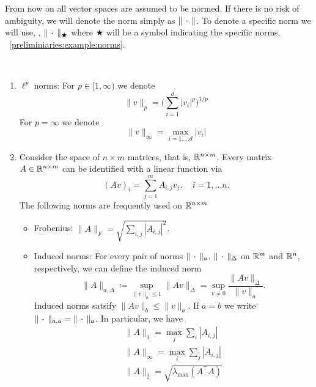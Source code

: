 From now on all vector spaces are assumed to be normed. If there is no risk of ambiguity, we will denote the norm simply as $\|\,\cdot\,\|$. To denote a specific norm we will use, \eg, $\|\,\cdot\,\|_\bigstar$ where $\bigstar$ will be a symbol indicating the specific norms, \cf~\cref{preliminiaries:example:norms}.

\begin{example}\
    \label{preliminiaries:example:norms}
    \begin{enumerate}
        \item $\ell^p$ norms: For $p\in [1,\infty)$ we denote 
        \begin{equation}
            \|v\|_p = \bigg( \sum_{i=1}^d |v_i|^p\bigg)^{1/p}
        \end{equation}
        For $p=\infty$ we denote 
        \begin{equation}
            \|v\|_\infty = \max_{i=1,\dots d}|v_i|
        \end{equation}
        \item Consider the space of $n\times m$ matrices, that is, $\mathbb{R}^{n\times m}$. Every matrix $A\in\mathbb{R}^{n\times m}$ can be identified with a linear function via
        \begin{equation}
            (Av)_i = \sum_{j=1}^m A_{i,j}v_j,\quad i=1,\dots n.
        \end{equation}
        The following norms are frequently used on $\mathbb{R}^{n\times m}$
        \begin{itemize}
            \item Frobenius: $\|A\|_F = \sqrt{\sum_{i,j}|A_{i,j}|^2}$.
            \item Induced norms: For every pair of norms $\|\,\cdot\,\|_a$, $\|\,\cdot\,\|_{\Delta}$ on $\mathbb{R}^m$ and $\mathbb{R}^n$, respectively, we can define the induced norm
            \begin{equation}
                \|A\|_{a,\Delta} \coloneq \sup_{\|v\|_a\leq 1}\|Av\|_\Delta = \sup_{v\neq 0}\frac{\|Av\|_\Delta}{\|v\|_a}.
            \end{equation}
            Induced norms satsify $\|Av\|_b\leq \|v\|_a$. If $a=b$ we write $\|\,\cdot\,\|_{a,a} = \|\,\cdot\,\|_a$. In particular, we have
            \begin{gather}
                \|A\|_{1} = \max_j \sum_i |A_{i,j}|\\
                \|A\|_{\infty} = \max_i \sum_j |A_{i,j}|\\
                \|A\|_{2} = \sqrt{\lambda_{\text{max}}(A^\top A)}

\end{gather}
\end{itemize}
\end{enumerate}
\end{example}
